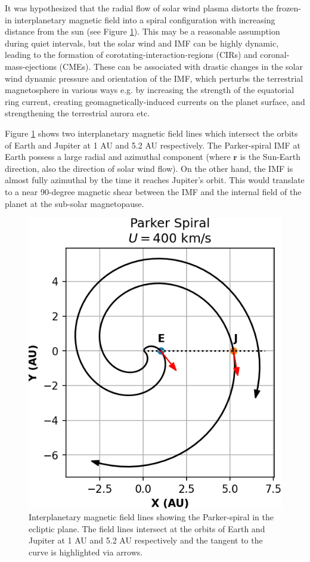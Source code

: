 It was hypothesized that the radial flow of solar wind plasma distorts the frozen-in interplanetary magnetic field into a spiral configuration with increasing distance from the sun \cite{Parker1958DynamicsFields.,Ness1964SolarField} (see Figure \ref{fig:parker-spiral}). This may be a reasonable assumption during quiet intervals, but the solar wind and IMF can be highly dynamic, leading to the formation of corotating-interaction-regions (CIRs) and coronal-mass-ejections (CMEs). These can be associated with drastic changes in the solar wind dynamic pressure and orientation of the IMF, which perturbs the terrestrial magnetosphere in various ways \cite{Borovsky2006DifferencesStorms,Denton2006GeomagneticWind} e.g. by increasing the strength of the equatorial ring current, creating geomagnetically-induced currents on the planet surface, and strengthening the terrestrial aurora etc.

Figure \ref{fig:parker-spiral} shows two interplanetary magnetic field lines which intersect the orbits of Earth and Jupiter at 1 AU and 5.2 AU respectively. The Parker-spiral IMF at Earth possess a large radial and azimuthal component (where $\mathbf{r}$ is the Sun-Earth direction, also the direction of solar wind flow). On the other hand, the IMF is almost fully azimuthal by the time it reaches Jupiter's orbit. This would translate to a near 90-degree magnetic shear between the IMF and the internal field of the planet at the sub-solar magnetopause. 

\begin{figure}
    \centering
    \includegraphics{images1/parker-spiral.png}
    \caption{Interplanetary magnetic field lines showing the Parker-spiral in the ecliptic plane. The field lines intersect at the orbits of Earth and Jupiter at 1 AU and 5.2 AU respectively and the tangent to the curve is highlighted via arrows.}
    \label{fig:parker-spiral}
\end{figure}

